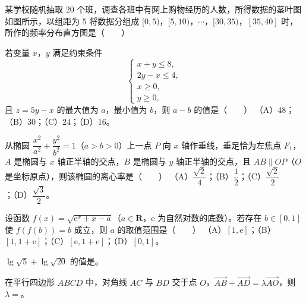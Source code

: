 \begin{question}
某学校随机抽取 $20$ 个班，调查各班中有网上购物经历的人数，所得数据的茎叶图如图所示，以组距为 $5$ 将数据分组成 $[0,5)$，$[5,10)$，$\cdots$，$[30,35)$，$[35,40]$ 时，所作的频率分布直方图是\mbox{（　　）}
\nopagebreak[4]
\begin{center}\end{center}
\nopagebreak[4]
\nopagebreak[4]
\begin{center}\end{center}
\nopagebreak[4]
\end{question}
\begin{question}
若变量 $x$，$y$ 满足约束条件
\nopagebreak[4]
\[\begin{cases}x+y\leqslant8,\\[2pt] 2y-x\leqslant4,\\[2pt] x\geqslant0,\\[2pt] y\geqslant0,\end{cases}\]
且 $z=5y-x$ 的最大值为 $a$，最小值为 $b$，则 $a-b$ 的值是\mbox{（　　）}
（A）$48$；（B）$30$；（C）$24$；（D）$16$。
\end{question}
\begin{question}
从椭圆 $\dfrac{x^2}{a^2}+\dfrac{y^2}{b^2}=1$（$a>b>0$）上一点 $P$ 向 $x$ 轴作垂线，垂足恰为左焦点 $F_1$，$A$ 是椭圆与 $x$ 轴正半轴的交点，$B$ 是椭圆与 $y$ 轴正半轴的交点，且 $AB\parallel OP$（$O$ 是坐标原点），则该椭圆的离心率是\mbox{（　　）}
（A）$\dfrac{\sqrt2}{4}$；（B）$\dfrac12$；（C）$\dfrac{\sqrt2}{2}$；（D）$\dfrac{\sqrt3}{2}$。
\end{question}
\begin{question}
设函数 $f(x)=\sqrt{\mathrm e^x+x-a}$（$a\in\mathbf R$，$\mathrm e$ 为自然对数的底数）。若存在 $b\in[0,1]$ 使 $f(f(b))=b$ 成立，则 $a$ 的取值范围是\mbox{（　　）}
（A）$[1,\mathrm e]$；（B）$[1,1+\mathrm e]$；（C）$[\mathrm e,1+\mathrm e]$；（D）$[0,1]$。
\end{question}
\begin{question}
$\lg\sqrt5+\lg\sqrt{20}$ 的值是\gkblank{}。
\Needspace{0.4\textheight}
\end{question}
\begin{question}
在平行四边形 $ABCD$ 中，对角线 $AC$ 与 $BD$ 交于点 $O$，$\overrightarrow{AB}+\overrightarrow{AD}=\lambda\overrightarrow{AO}$，则 $\lambda=$\gkblank{}。
\nopagebreak[4]
\begin{center}\end{center}
\nopagebreak[4]
\end{question}

